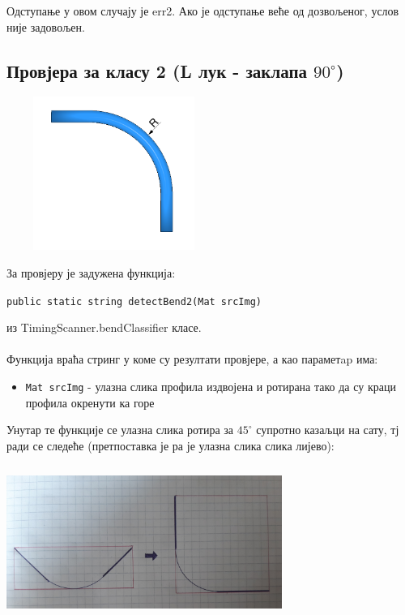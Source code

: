 \documentclass[12pt]{article}
\begin{document}
Одступање у овом случају је err2. Ако је одступање веће од дозвољеног, услов није задовољен.

\subsection{Провјера за класу 2 (L лук - заклапа $90^\circ$)}
\vspace{0.5cm}
\begin{center}
    \centering 
    \includegraphics[height=5cm, width=7cm]{images/klasa2.jpg}
\end{center}
\vspace{0.5cm}
За провјеру је задужена функција:
\begin{center}
\texttt{public static string detectBend2(Mat srcImg)}
\end{center}
из TimingScanner.bendClassifier класе.\\\\
Функција враћа стринг у коме су резултати провјере, а као параметap има:
\begin{itemize}
    \item \texttt{Mat srcImg} - улазна слика профила издвојена и ротирана тако да су краци профила окренути ка горе 
\end{itemize}
Унутар те функције се улазна слика ротира за $45^\circ$ супротно казаљци на сату, тј ради се следеће (претпоставка је ра је улазна слика слика лијево):
\vspace{0.5cm}
\begin{center}
    \centering 
    \includegraphics[height=5cm, width=9cm]{images/detect3.jpg}
\end{center}
\end{document}

